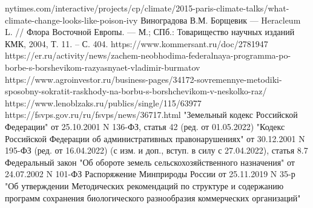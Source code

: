 \begin{thebibliography}{99}
	
	
	nytimes.com/interactive/projects/cp/climate/2015-paris-climate-talks/what-climate-change-looks-like-poison-ivy
	 Виноградова В.М. Борщевик — Heracleum L. // Флора Восточной Европы. — М.; СПб.: Товарищество научных изданий КМК, 2004, Т. 11. – С. 404.
	 https://www.kommersant.ru/doc/2781947
	 https://er.ru/activity/news/zachem-neobhodima-federalnaya-programma-po-borbe-s-borshevikom-razyasnyaet-vladimir-burmatov
	 https://www.agroinvestor.ru/business-pages/34172-sovremennye-metodiki-sposobny-sokratit-raskhody-na-borbu-s-borshchevikom-v-neskolko-raz/
	 https://www.lenoblzaks.ru/publics/single/115/63977
	 https://fsvps.gov.ru/ru/fsvps/news/36717.html
	 "Земельный кодекс Российской Федерации" от 25.10.2001 N 136-ФЗ, статья 42 (ред. от 01.05.2022)
	 "Кодекс Российской Федерации об административных правонарушениях" от 30.12.2001 N 195-ФЗ (ред. от 16.04.2022) (с изм. и доп., вступ. в силу с 27.04.2022), статья 8.7
	 Федеральный закон "Об обороте земель сельскохозяйственного назначения" от 24.07.2002 N 101-ФЗ
	 Распоряжение Минприроды России от 25.11.2019 N 35-р "Об утверждении Методических рекомендаций по структуре и содержанию программ сохранения биологического разнообразия коммерческих организаций"
\end{thebibliography}
